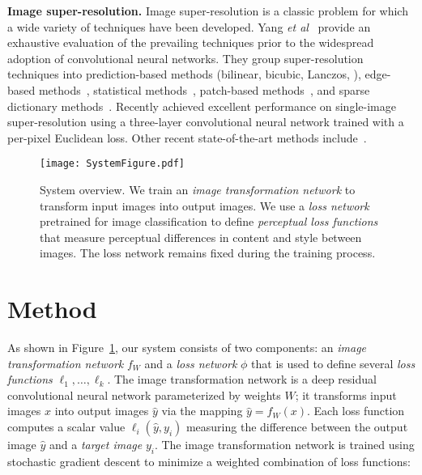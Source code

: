 \documentclass[runningheads]{llncs}
\newcommand{\etal}{\textit{et al}}
\begin{document}
\textbf{Image super-resolution.}
Image super-resolution is a classic problem for which a wide variety of techniques have
been developed. Yang \etal~\cite{yang2014single} provide an exhaustive evaluation of
the prevailing techniques prior to the widespread adoption of convolutional neural networks.
They group super-resolution techniques into prediction-based methods (bilinear, bicubic,
Lanczos, \cite{irani1991improving}), edge-based methods~\cite{freedman2011image,sun2008image},
statistical methods~\cite{shan2008fast,kim2010single,xiong2010robust}, patch-based
methods~\cite{freedman2011image,freeman2002example,chang2004super,glasner2009super,yang2013fast,sun2003image,ni2007image,he2013beta},
and sparse dictionary methods~\cite{yang2008image,yang2010image}.
Recently \cite{dong2015image} achieved excellent performance on single-image
super-resolution using a three-layer convolutional neural network trained with a per-pixel
Euclidean loss. Other recent state-of-the-art methods
include~\cite{timofte2014adjusted,schulter2015fast,huang2015single}.




\begin{figure}[t]
  \centering
  \texttt{[image: SystemFigure.pdf]}
  \vspace{-3mm}
  \caption{System overview. We train an \emph{image transformation network} to transform
    input images into output images. We use a \emph{loss network} pretrained for image
    classification to define \emph{perceptual loss functions} that measure perceptual
    differences in content and style between images. The loss network remains fixed
    during the training process.
  }
  \vspace{-3mm}
  \label{fig:system}
\end{figure}

\section{Method}
\label{sec:method}
As shown in Figure~\ref{fig:system}, our system consists of two components:
an \emph{image transformation network} $f_W$ and a \emph{loss network} $\phi$ that
is used to define several \emph{loss functions} $\ell_1,\ldots,\ell_k$. The image
transformation network is a deep residual convolutional neural network parameterized by
weights $W$; it transforms input images $x$ into output images $\hat y$ via the
mapping $\hat y = f_W(x)$. Each loss function computes a scalar value $\ell_i(\hat y, y_i)$
measuring the difference between the output image $\hat y$ and a \emph{target image} $y_i$.
The image transformation network is trained using stochastic gradient descent to minimize
a weighted combination of loss functions:
\end{document}
